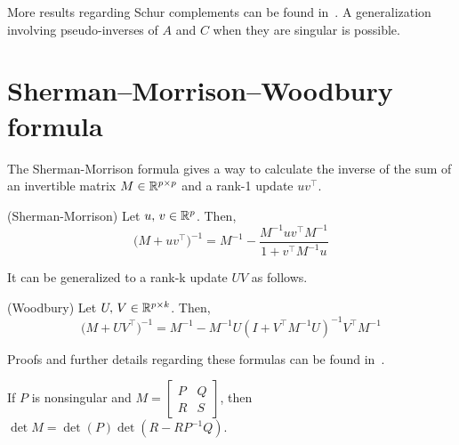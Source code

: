 More results regarding Schur complements can be found in~\cite{schur_complement}.
A generalization involving pseudo-inverses of $A$ and $C$ when they are singular is possible.

\section{Sherman–Morrison–Woodbury formula}\label{sec:sherman}

The Sherman-Morrison formula gives a way to calculate the inverse of the sum of an invertible matrix
$M \in \mathbb{R}^{p \times p}$
and a rank-1 update $uv^\top$.
\begin{theorem}
    (Sherman-Morrison) Let $u,\, v \in \mathbb{R}^p$.
    Then,
    \begin{equation*}
        \big( M + uv^\top \big)^{-1} = M^{-1} - \frac{M^{-1}uv^\top M^{-1}}{1 + v^\top M^{-1}u}
    \end{equation*}
\end{theorem}
It can be generalized to a rank-k update $UV$ as follows.
\begin{theorem}
    (Woodbury) Let $U,\, V \in \mathbb{R}^{p \times k}$.
    Then,
    \begin{equation*}
        \big( M + UV^\top \big)^{-1} = M^{-1} - M^{-1}U \left( I + V^\top M^{-1}U \right)^{-1}V^\top M^{-1}
    \end{equation*}
\end{theorem}
Proofs and further details regarding these formulas can be found in~\cite{woodbury}.

    If $P$ is nonsingular and $M = \begin{bmatrix}
    P & Q\\
    R & S
\end{bmatrix}$,
then $\det M = \det(P)\det(R - RP^{-1}Q)$.